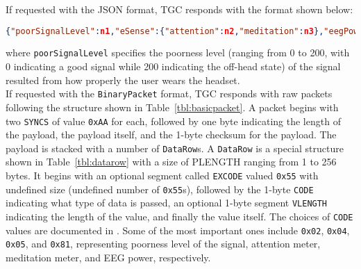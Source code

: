 %
\indent If requested with the JSON format, TGC responds with the format shown below:
\begin{lstlisting}[language=json]
{"poorSignalLevel":n1,"eSense":{"attention":n2,"meditation":n3},"eegPower":{"delta":n4,"theta":n5,"lowAlpha":n6,"highAlpha":n7,"lowBeta":n8,"highBeta":n9,"lowGamma":n10,"highGamma":n11}}
\end{lstlisting}
where \texttt{poorSignalLevel} specifies the poorness level (ranging from 0 to 200, with 0 indicating a good signal while 200 indicating the off-head state) of the signal resulted from how properly the user wears the headset.\\
%
\indent If requested with the \texttt{BinaryPacket} format, TGC responds with raw packets following the structure shown in Table~\ref{tbl:basicpacket}. A packet begins with two \texttt{SYNCS} of value \texttt{0xAA} for each, followed by one byte indicating the length of the payload, the payload itself, and the 1-byte checksum for the payload. The payload is stacked with a number of \texttt{DataRow}s. A  \texttt{DataRow} is a special structure shown in Table~\ref{tbl:datarow} with a size of PLENGTH ranging from 1 to 256 bytes. It begins with an optional segment called \texttt{EXCODE} valued \texttt{0x55} with undefined size (undefined number of \texttt{0x55}s), followed by the 1-byte \texttt{CODE} indicating what type of data is passed, an optional 1-byte segment \texttt{VLENGTH} indicating the length of the value, and finally the value itself. The choices of \texttt{CODE} values are documented in \cite{tgsprawpacket}. Some of the most important ones include \texttt{0x02}, \texttt{0x04}, \texttt{0x05}, and \texttt{0x81}, representing poorness level of the signal, attention meter, meditation meter, and EEG power, respectively. 

